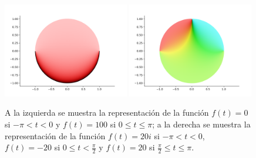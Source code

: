 \begin{figure}[H]
    \centering
    \includegraphics[width=0.49\textwidth]{../Aplicacion/atrozos.png}
    \hfil
    \includegraphics[width=0.49\textwidth]{../Aplicacion/atrozos(2).png}
\caption{A la izquierda se muestra la representación de la función $f(t) = 0$ si $- \pi < t < 0$ y $f(t) = 100$ si $0 \leq t \leq \pi$; a la derecha se muestra la representación de la función $f(t) = 20i$ si $- \pi < t < 0$, $f(t) = -20$ si $0 \leq t < \frac{\pi}{2}$ y $f(t) = 20$ si $\frac{\pi}{2} \leq t \leq \pi$.}
    \label{fig:atrozos}
\end{figure}

